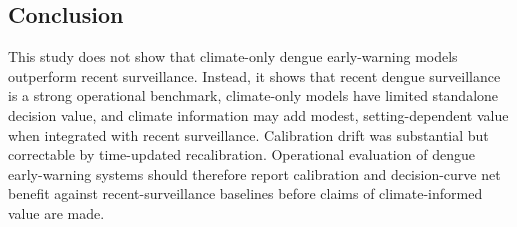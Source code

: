 \documentclass[11pt,a4paper]{article}
\begin{document}
\subsection{Conclusion}
\label{subsec:discussion-conclusion}

This study does not show that climate-only dengue early-warning models outperform recent surveillance. Instead, it shows that recent dengue surveillance is a strong operational benchmark, climate-only models have limited standalone decision value, and climate information may add modest, setting-dependent value when integrated with recent surveillance. Calibration drift was substantial but correctable by time-updated recalibration. Operational evaluation of dengue early-warning systems should therefore report calibration and decision-curve net benefit against recent-surveillance baselines before claims of climate-informed value are made.
















\end{document}
